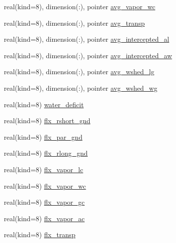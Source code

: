 \begin{DoxyCompactItemize}
\item 
real(kind=8), dimension(\+:), pointer \hyperlink{structrk4__coms_1_1rk4patchtype_a55a8b0a5fd4019d12159c9e48025db0b}{avg\+\_\+vapor\+\_\+wc}
\item 
real(kind=8), dimension(\+:), pointer \hyperlink{structrk4__coms_1_1rk4patchtype_ae85ad3980980cada7d4fb144a74f110a}{avg\+\_\+transp}
\item 
real(kind=8), dimension(\+:), pointer \hyperlink{structrk4__coms_1_1rk4patchtype_ae947c599ce5e8a11249f74ba4701fce2}{avg\+\_\+intercepted\+\_\+al}
\item 
real(kind=8), dimension(\+:), pointer \hyperlink{structrk4__coms_1_1rk4patchtype_a8140b6e19ba442f383886cab769cc864}{avg\+\_\+intercepted\+\_\+aw}
\item 
real(kind=8), dimension(\+:), pointer \hyperlink{structrk4__coms_1_1rk4patchtype_a018e4fa2fc1e1fc551ab51a4e0521839}{avg\+\_\+wshed\+\_\+lg}
\item 
real(kind=8), dimension(\+:), pointer \hyperlink{structrk4__coms_1_1rk4patchtype_af555a7dbf808cae7ef86169e8b66f33c}{avg\+\_\+wshed\+\_\+wg}
\item 
real(kind=8) \hyperlink{structrk4__coms_1_1rk4patchtype_ad400e8bf08adaf165b7da72714df2dd2}{water\+\_\+deficit}
\item 
real(kind=8) \hyperlink{structrk4__coms_1_1rk4patchtype_ad3a9ac2010ae5cea9c66c604a40c9e48}{flx\+\_\+rshort\+\_\+gnd}
\item 
real(kind=8) \hyperlink{structrk4__coms_1_1rk4patchtype_a4a63ab39f543f5e00ac25c133f7f99e2}{flx\+\_\+par\+\_\+gnd}
\item 
real(kind=8) \hyperlink{structrk4__coms_1_1rk4patchtype_a3660bfc56837714eb2e040dd7dac6899}{flx\+\_\+rlong\+\_\+gnd}
\item 
real(kind=8) \hyperlink{structrk4__coms_1_1rk4patchtype_a55d7ddf118ee323101038bf3b29a6957}{flx\+\_\+vapor\+\_\+lc}
\item 
real(kind=8) \hyperlink{structrk4__coms_1_1rk4patchtype_a54fe0a467638e6405b33a5a75e6ceebb}{flx\+\_\+vapor\+\_\+wc}
\item 
real(kind=8) \hyperlink{structrk4__coms_1_1rk4patchtype_a3b1c2024e71fc783020b6f0d0c61bf9f}{flx\+\_\+vapor\+\_\+gc}
\item 
real(kind=8) \hyperlink{structrk4__coms_1_1rk4patchtype_ae078df8a87c330c45409df2e8d20cd02}{flx\+\_\+vapor\+\_\+ac}
\item 
real(kind=8) \hyperlink{structrk4__coms_1_1rk4patchtype_accb17da2d6aad6e99d0db2f0b139123e}{flx\+\_\+transp}
\item 

\end{DoxyCompactItemize}
